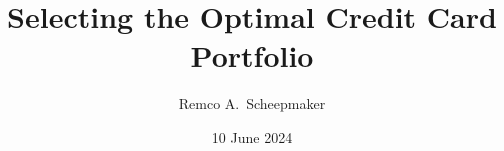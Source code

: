 \documentclass[notes,compress,sanserif,professionalfont]{beamer}
\begin{document}
\title{Selecting the Optimal Credit Card Portfolio}
\author{Remco A.~Scheepmaker}
\date{10 June 2024}

\begin{frame}
  \titlepage
\end{frame}



%
\end{document}
